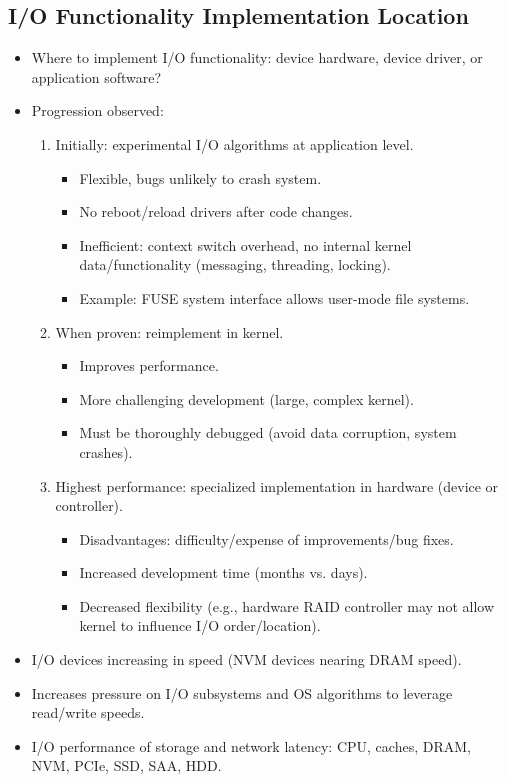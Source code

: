 \subsection{I/O Functionality Implementation Location}
\begin{itemize}
    \item Where to implement I/O functionality: device hardware, device driver, or application software?
    \item Progression observed:
    \begin{enumerate}
        \item Initially: experimental I/O algorithms at application level.
        \begin{itemize}
            \item Flexible, bugs unlikely to crash system.
            \item No reboot/reload drivers after code changes.
            \item Inefficient: context switch overhead, no internal kernel data/functionality (messaging, threading, locking).
            \item Example: FUSE system interface allows user-mode file systems.
        \end{itemize}
        \item When proven: reimplement in kernel.
        \begin{itemize}
            \item Improves performance.
            \item More challenging development (large, complex kernel).
            \item Must be thoroughly debugged (avoid data corruption, system crashes).
        \end{itemize}
        \item Highest performance: specialized implementation in hardware (device or controller).
        \begin{itemize}
            \item Disadvantages: difficulty/expense of improvements/bug fixes.
            \item Increased development time (months vs. days).
            \item Decreased flexibility (e.g., hardware RAID controller may not allow kernel to influence I/O order/location).
        \end{itemize}
    \end{enumerate}
    \item I/O devices increasing in speed (NVM devices nearing DRAM speed).
    \item Increases pressure on I/O subsystems and OS algorithms to leverage read/write speeds.
    \item I/O performance of storage and network latency: CPU, caches, DRAM, NVM, PCIe, SSD, SAA, HDD.
\end{itemize}

